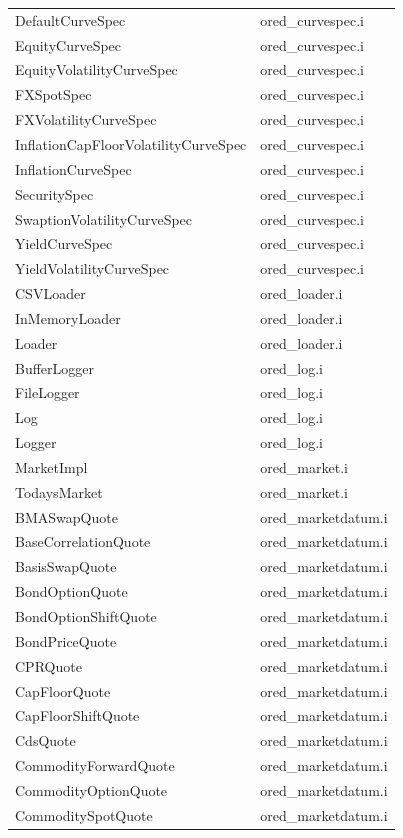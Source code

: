\documentclass[12pt, a4paper]{report}
\begin{document}
\begin{appendix}
{\begin{longtable}{|l|l|}
DefaultCurveSpec & ored\_curvespec.i \\
EquityCurveSpec & ored\_curvespec.i \\
EquityVolatilityCurveSpec & ored\_curvespec.i \\
FXSpotSpec & ored\_curvespec.i \\
FXVolatilityCurveSpec & ored\_curvespec.i \\
InflationCapFloorVolatilityCurveSpec & ored\_curvespec.i \\
InflationCurveSpec & ored\_curvespec.i \\
SecuritySpec & ored\_curvespec.i \\
SwaptionVolatilityCurveSpec & ored\_curvespec.i \\
YieldCurveSpec & ored\_curvespec.i \\
YieldVolatilityCurveSpec & ored\_curvespec.i \\
CSVLoader & ored\_loader.i \\
InMemoryLoader & ored\_loader.i \\
Loader & ored\_loader.i \\
BufferLogger & ored\_log.i \\
FileLogger & ored\_log.i \\
Log & ored\_log.i \\
Logger & ored\_log.i \\
MarketImpl & ored\_market.i \\
TodaysMarket & ored\_market.i \\
BMASwapQuote & ored\_marketdatum.i \\
BaseCorrelationQuote & ored\_marketdatum.i \\
BasisSwapQuote & ored\_marketdatum.i \\
BondOptionQuote & ored\_marketdatum.i \\
BondOptionShiftQuote & ored\_marketdatum.i \\
BondPriceQuote & ored\_marketdatum.i \\
CPRQuote & ored\_marketdatum.i \\
CapFloorQuote & ored\_marketdatum.i \\
CapFloorShiftQuote & ored\_marketdatum.i \\
CdsQuote & ored\_marketdatum.i \\
CommodityForwardQuote & ored\_marketdatum.i \\
CommodityOptionQuote & ored\_marketdatum.i \\
CommoditySpotQuote & ored\_marketdatum.i \\

\end{longtable}}
\end{appendix}
\end{document}
